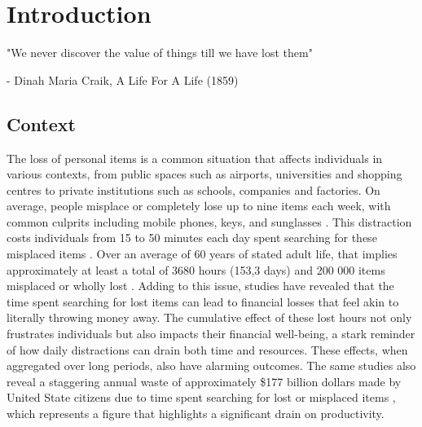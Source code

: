 \chapter{Introduction}
\label{chapter:introduction}

\begin{introduction}
"We never discover the value of things till we have lost them"

- Dinah Maria Craik, A Life For A Life (1859)
\end{introduction}

\section{Context} \label{section:context}

The loss of personal items is a common situation that affects individuals in various contexts, from public spaces such as airports, universities and shopping centres \cites{Oke2017, Yao2019} to private institutions such as schools, companies and factories. On average, people misplace or completely lose up to nine items each week, with common culprits including mobile phones, keys, and sunglasses \cite{Prawira2024}. This distraction costs individuals from 15 to 50 minutes each day spent searching for these misplaced items \cites{Prawira2024, Knierim2012}. Over an average of 60 years of stated adult life, that implies approximately at least a total of 3680 hours (153,3 days) and 200 000 items misplaced or wholly lost \cite{Ahmad2015}. Adding to this issue, studies have revealed that the time spent searching for lost items can lead to financial losses that feel akin to literally throwing money away. The cumulative effect of these lost hours not only frustrates individuals but also impacts their financial well-being, a stark reminder of how daily distractions can drain both time and resources. These effects, when aggregated over long periods, also have alarming outcomes. The same studies also reveal a staggering annual waste of approximately \$177 billion dollars made by United State citizens \cite{Newswire2010} due to time spent searching for lost or misplaced items \cite{Ahmad2015}, which represents a figure that highlights a significant drain on productivity.

